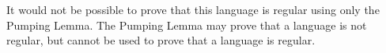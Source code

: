 

It would not be possible to prove that this language is regular using only the Pumping Lemma. The Pumping Lemma may prove that a language is not regular, but cannot be used to prove that a language is regular.